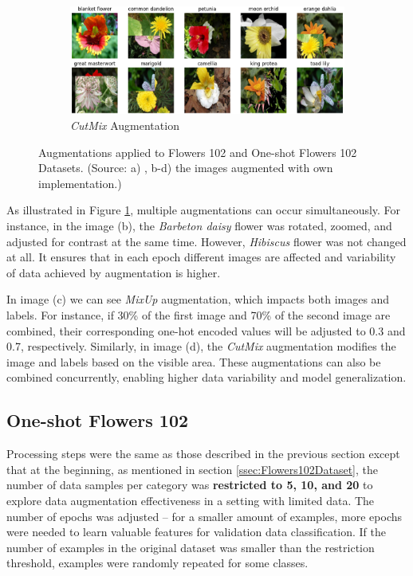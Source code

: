 \begin{figure}[!htb]
    \begin{subfigure}{0.7\textwidth}
        \includegraphics[scale=0.85]{cutmix-augmentation.png}
        \caption{\textit{CutMix} Augmentation}
    \end{subfigure}

    \caption{Augmentations applied to Flowers 102 and One-shot Flowers 102 Datasets. (Source: a) \cite{Flowers102}, b-d) the images augmented with own implementation.)}
    \label{fig:flowersAugmentations}
\end{figure}

As illustrated in Figure \ref{fig:flowersAugmentations}, multiple augmentations can occur simultaneously. For instance, in the image (b), the \textit{Barbeton daisy} flower was rotated, zoomed, and adjusted for contrast at the same time. However, \textit{Hibiscus} flower was not changed at all. It ensures that in each epoch different images are affected and variability of data achieved by augmentation is higher. 

In image (c) we can see \textit{MixUp} augmentation, which impacts both images and labels. For instance, if 30\% of the first image and 70\% of the second image are combined, their corresponding one-hot encoded values will be adjusted to 0.3 and 0.7, respectively. Similarly, in image (d), the \textit{CutMix} augmentation modifies the image and labels based on the visible area. These augmentations can also be combined concurrently, enabling higher data variability and model generalization.

\subsection{One-shot Flowers 102}
\label{ssec:flowersOneShotProcessing}

Processing steps were the same as those described in the previous section except that at the beginning, as mentioned in section \ref{ssec:Flowers102Dataset}, the number of data samples per category was \textbf{restricted to 5, 10, and 20} to explore data augmentation effectiveness in a setting with limited data. The number of epochs was adjusted -- for a smaller amount of examples, more epochs were needed to learn valuable features for validation data classification. If the number of examples in the original dataset was smaller than the restriction threshold, examples were randomly repeated for some classes. 

